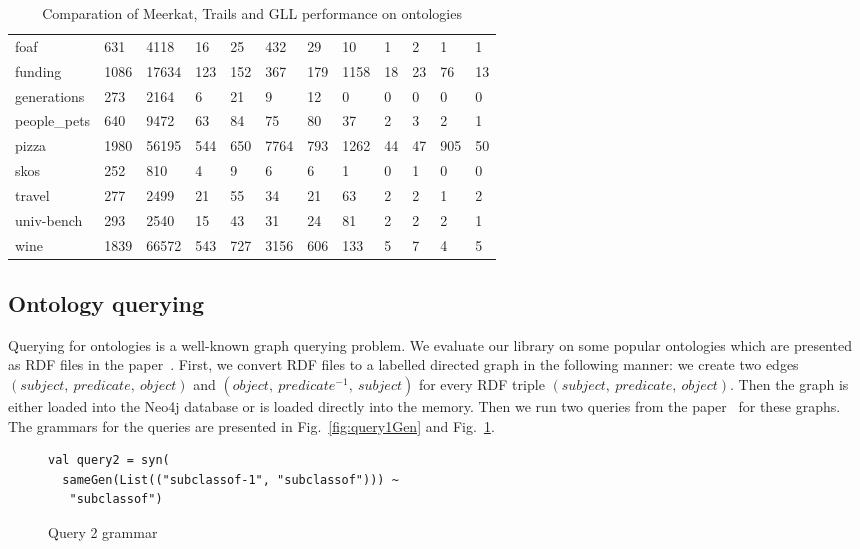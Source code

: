 \begin{table*}[t]
\begin{tabular}{|l|l|lllll|lllll|}
foaf                        & 631  & 4118  & 16  & 25  & 432  & 29  & 10   & 1  & 2  & 1   & 1 \\
funding                     & 1086 & 17634 & 123 & 152 & 367  & 179 & 1158 & 18 & 23 & 76  & 13 \\
generations                 & 273  & 2164  & 6   & 21  & 9    & 12  & 0    & 0  & 0  & 0   & 0 \\
people\_pets                & 640  & 9472  & 63  & 84  & 75   & 80  & 37   & 2  & 3  & 2   & 1 \\
pizza                       & 1980 & 56195 & 544 & 650 & 7764 & 793 & 1262 & 44 & 47 & 905 & 50 \\
skos                        & 252  & 810   & 4   & 9   & 6    & 6   & 1    & 0  & 1  & 0   & 0 \\
travel                      & 277  & 2499  & 21  & 55  & 34   & 21  & 63   & 2  & 2  & 1   & 2 \\
univ-bench                  & 293  & 2540  & 15  & 43  & 31   & 24  & 81   & 2  & 2  & 2   & 1 \\
wine                        & 1839 & 66572 & 543 & 727 & 3156 & 606 & 133  & 5  & 7   & 4   & 5 \\
\hline
\end{tabular}
\caption{Comparation of Meerkat, Trails and GLL performance on ontologies}
\label{table:rdfs}
\end{table*}


\subsection{Ontology querying}
\label{sec:ontology}

Querying for ontologies is a well-known graph querying problem. We evaluate our library on some popular ontologies which are presented as RDF files in the paper~\cite{CFGonRDF}. 
First, we convert RDF files to a labelled directed graph in the following manner: we create two edges $(subject,\ predicate,\ object)$ and $(object,\ predicate^{-1},\ subject)$ for every RDF triple $(subject,\ predicate,\ object)$. Then the graph is either loaded into the Neo4j database or is loaded directly into the memory. 
Then we run two queries from the paper~\cite{GrigorevR16} for these graphs. The grammars for the queries are presented in Fig.~\ref{fig:query1Gen} and Fig.~\ref{fig:query2Gen}.

\begin{figure}[h]
\begin{lstlisting}
val query2 = syn(
  sameGen(List(("subclassof-1", "subclassof"))) ~
   "subclassof")
\end{lstlisting}
\caption{Query 2 grammar}
\label{fig:query2Gen}
\end{figure}

